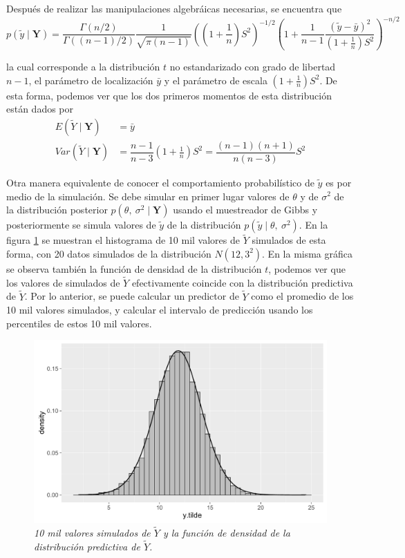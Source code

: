 Después de realizar las manipulaciones algebráicas necesarias, se encuentra que 
\begin{equation}\label{post_y_no_informativa_t_student}
p(\tilde{y}\mid\mathbf{Y})=\dfrac{\Gamma(n/2)}{\Gamma((n-1)/2)}\dfrac{1}{\sqrt{\pi(n-1)}}\left(\left(1+\frac{1}{n}\right)S^2\right)^{-1/2}\left(1+\dfrac{1}{n-1}\dfrac{(\tilde{y}-\bar{y})^2}{\left(1+\frac{1}{n}\right)S^2}\right)^{-n/2}
\end{equation}

la cual corresponde a la distribución $t$ no estandarizado con grado de libertad $n-1$, el parámetro de localización $\bar{y}$ y el parámetro de escala $(1+\frac{1}{n})S^2$. De esta forma, podemos ver que los dos primeros momentos de esta distribución están dados por
\begin{align*}
E(\tilde{Y}\mid\mathbf{Y})&=\bar{y}\\
Var(\tilde{Y}\mid\mathbf{Y})&=\dfrac{n-1}{n-3}\left(1+\frac{1}{n}\right)S^2=\dfrac{(n-1)(n+1)}{n(n-3)}S^2
\end{align*}

Otra manera equivalente de conocer el comportamiento probabilístico de $\tilde{y}$ es por medio de la simulación. Se debe simular en primer lugar valores de $\theta$ y de $\sigma^2$ de la distribución posterior $p(\theta,\ \sigma^2\mid\mathbf{Y})$ usando el muestreador de Gibbs y posteriormente se simula valores de $\tilde{y}$ de la distribución $p(\tilde{y}\mid\theta,\ \sigma^2)$. En la figura \ref{predictiva_y_priori_noninformative} se muestran el histograma de 10 mil valores de $\tilde{Y}$ simulados de esta forma, con 20 datos simulados de la distribución $N(12,3^2)$. En la misma gráfica se observa también la función de densidad de la distribución $t$, podemos ver que los valores de simulados de $\tilde{Y}$ efectivamente coincide con la distribución predictiva de $\tilde{Y}$. Por lo anterior, se puede calcular un predictor de $\tilde{Y}$ como el promedio de los 10 mil valores simulados, y calcular el intervalo de predicción usando los percentiles de estos 10 mil valores.
 
\begin{figure}[!htb]\label{predictiva_y_priori_noninformative}
\centering
\includegraphics[scale=0.5]{predictiva_y_priori_noninformative.pdf}
\caption{\emph{10 mil valores simulados de $\tilde{Y}$ y la función de densidad de la distribución predictiva de $\tilde{Y}$.}}
\end{figure}

